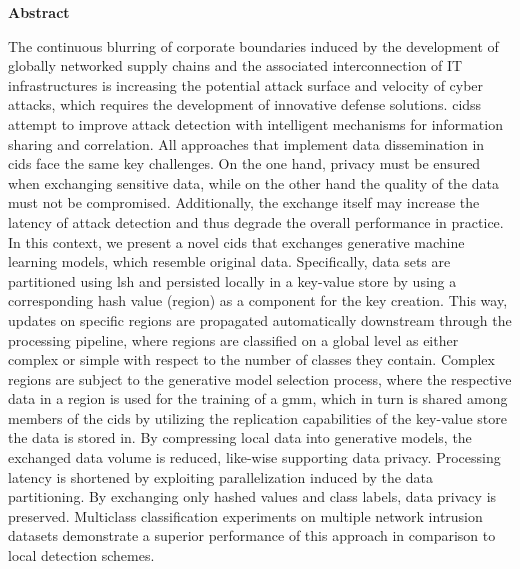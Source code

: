 \documentclass[../main.tex]{subfiles}
\begin{document}
\begin{adjustwidth}{2cm}{2cm}
\begin{center}
    \small\textbf{Abstract}
\end{center}
\par\medskip

The continuous blurring of corporate boundaries induced by the development of globally networked supply chains and the associated interconnection of IT infrastructures is increasing the potential attack surface and velocity of cyber attacks, which requires the development of innovative defense solutions.
\glspl{cids} attempt to improve attack detection with intelligent mechanisms for information sharing and correlation.
All approaches that implement data dissemination in \gls{cids} face the same key challenges.
On the one hand, privacy must be ensured when exchanging sensitive data, while on the other hand the quality of the data must not be compromised. 
Additionally, the exchange itself may increase the latency of attack detection and thus degrade the overall performance in practice.
In this context, we present a novel \gls{cids} that exchanges generative machine learning models, which resemble original data. 
Specifically, data sets are partitioned using \gls{lsh} and persisted locally in a key-value store by using a corresponding hash value (region) as a component for the key creation.
This way, updates on specific regions are propagated automatically downstream through the processing pipeline, where regions are classified on a global level as either complex or simple with respect to the number of classes they contain.
Complex regions are subject to the generative model selection process, where the respective data in a region is used for the training of a \gls{gmm}, which in turn is shared among members of the \gls{cids} by utilizing the replication capabilities of the key-value store the data is stored in.
By compressing local data into generative models, the exchanged data volume is reduced, like-wise supporting data privacy.
Processing latency is shortened by exploiting parallelization induced by the data partitioning.
By exchanging only hashed values and class labels, data privacy is preserved. 
Multiclass classification experiments on multiple network intrusion datasets demonstrate a superior performance of this approach in comparison to local detection schemes.
\end{adjustwidth}
\vfill
\hspace{0pt}
\par\endgroup
\bigskip\noindent
\end{document}
